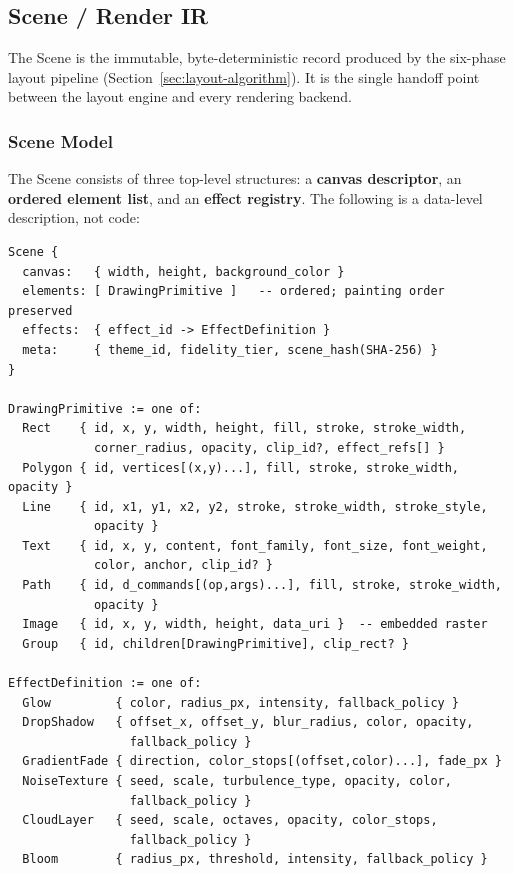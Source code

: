 \subsection{Scene / Render IR}
\label{sec:scene-ir}

The Scene is the immutable, byte-deterministic record produced by the six-phase layout
pipeline (Section~\ref{sec:layout-algorithm}). It is the single handoff point between the
layout engine and every rendering backend.

\subsubsection{Scene Model}
\label{sec:scene-model}

The Scene consists of three top-level structures: a \textbf{canvas descriptor}, an
\textbf{ordered element list}, and an \textbf{effect registry}. The following is a
data-level description, not code:

\begin{Verbatim}[frame=single,fontsize=\small]
Scene {
  canvas:   { width, height, background_color }
  elements: [ DrawingPrimitive ]   -- ordered; painting order preserved
  effects:  { effect_id -> EffectDefinition }
  meta:     { theme_id, fidelity_tier, scene_hash(SHA-256) }
}

DrawingPrimitive := one of:
  Rect    { id, x, y, width, height, fill, stroke, stroke_width,
            corner_radius, opacity, clip_id?, effect_refs[] }
  Polygon { id, vertices[(x,y)...], fill, stroke, stroke_width, opacity }
  Line    { id, x1, y1, x2, y2, stroke, stroke_width, stroke_style,
            opacity }
  Text    { id, x, y, content, font_family, font_size, font_weight,
            color, anchor, clip_id? }
  Path    { id, d_commands[(op,args)...], fill, stroke, stroke_width,
            opacity }
  Image   { id, x, y, width, height, data_uri }  -- embedded raster
  Group   { id, children[DrawingPrimitive], clip_rect? }

EffectDefinition := one of:
  Glow         { color, radius_px, intensity, fallback_policy }
  DropShadow   { offset_x, offset_y, blur_radius, color, opacity,
                 fallback_policy }
  GradientFade { direction, color_stops[(offset,color)...], fade_px }
  NoiseTexture { seed, scale, turbulence_type, opacity, color,
                 fallback_policy }
  CloudLayer   { seed, scale, octaves, opacity, color_stops,
                 fallback_policy }
  Bloom        { radius_px, threshold, intensity, fallback_policy }
\end{Verbatim}


